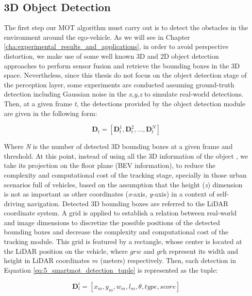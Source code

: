 \subsection{3D Object Detection}

The first step our \ac{MOT} algorithm must carry out is to detect the obstacles in the environment around the ego-vehicle. As we will see in Chapter \ref{cha:experimental_results_and_applications}, in order to avoid perspective distortion, we make use of some well known 3D and 2D object detection approaches \cite{lang2019pointpillars, redmon2016you} to perform sensor fusion and retrieve the bounding boxes in the 3D space. Nevertheless, since this thesis do not focus on the object detection stage of the perception layer, some experiments are conducted assuming ground-truth detection including Gaussian noise in the \textit{x,y,z} to simulate real-world detections. Then, at a given frame \textit{t}, the detections provided by the object detection module are given in the following form:

\begin{equation}
	\label{eq:5_smartmot_detection}
	\textbf{D}_{t} =[\textbf{D}_{t}^{1},\textbf{D}_{t}^{2}, ...,\textbf{D}_{t}^{N}]
\end{equation}

Where \textit{N} is the number of detected 3D bounding boxes at a given frame and threshold. At this point, instead of using all the 3D information of the object \cite{chiu2021probabilistic, weng20203d}, we take its projection on the floor plane (\ac{BEV} information), to reduce the complexity and computational cost of the tracking stage, specially in those urban scenarios full of vehicles, based on the assumption that the height (\textit{z}) dimension is not as important as other coordinates (\textit{x}-axis, \textit{y}-axis) in a context of self-driving navigation. Detected 3D bounding boxes are referred to the LiDAR coordinate system. A grid is applied to establish a relation between real-world and image dimensions to discretize the possible positions of the detected bounding boxes and decrease the complexity and computational cost of the tracking module. This grid is featured by a rectangle, whose center is located at the LiDAR position on the vehicle, where $\textit{grw}$ and $\textit{grh}$ represent its width and height in LiDAR coordinates $\textit{m}$ (meters) respectively. Then, each detection in Equation \ref{eq:5_smartmot_detection_tuple} is represented as the tuple:

\begin{equation}
	\label{eq:5_smartmot_detection_tuple}
	\textbf{D}_{t}^{i} = [x_{m},y_{m},w_{m},l_{m},\theta,type,score]
\end{equation}

